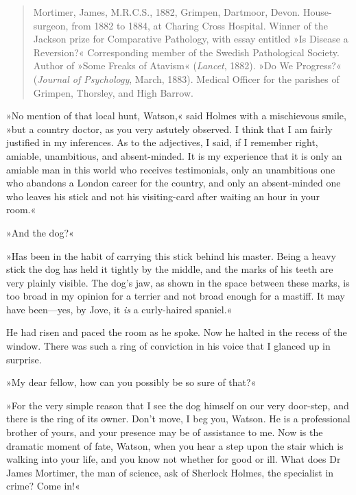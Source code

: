 \begin{quote}Mortimer, James, M.R.C.S., 1882, Grimpen, Dartmoor, Dev\-on. House-surgeon, from 1882 to 1884, at Charing Cross Hospital. Winner of the Jackson prize for Comparative Pathology, with essay entitled »Is Disease a Reversion?« Corresponding member of the Swedish Pathological Society. Author of »Some Freaks of Atavism« (\textit{Lancet}, 1882). »Do We Progress?« (\textit{Journal of Psychology}, March, 1883). Medical Officer for the parishes of Grimpen, Thorsley, and High Barrow.\end{quote}

»No mention of that local hunt, Watson,« said Holmes with a mischievous smile, »but a country doctor, as you very astutely observed. I think that I am fairly justified in my inferences. As to the adjectives, I said, if I remember right, amiable, unambitious, and absent-minded. It is my experience that it is only an amiable man in this world who receives testimonials, only an unambitious one who abandons a London career for the country, and only an absent-minded one who leaves his stick and not his visiting-card after waiting an hour in your room.«

»And the dog?«

»Has been in the habit of carrying this stick behind his master. Being a heavy stick the dog has held it tightly by the middle, and the marks of his teeth are very plainly visible. The dog's jaw, as shown in the space between these marks, is too broad in my opinion for a terrier and not broad enough for a mastiff. It may have been\allowbreak---\allowbreak yes, by Jove, it \emph{is} a curly-haired spaniel.«

He had risen and paced the room as he spoke. Now he halted in the recess of the window. There was such a ring of conviction in his voice that I glanced up in surprise.

»My dear fellow, how can you possibly be so sure of that?«

»For the very simple reason that I see the dog himself on our very door-step, and there is the ring of its owner. Don't move, I beg you, Watson. He is a professional brother of yours, and your presence may be of assistance to me. Now is the dramatic moment of fate, Watson, when you hear a step upon the stair which is walking into your life, and you know not whether for good or ill. What does Dr James Mortimer, the man of science, ask of Sherlock Holmes, the specialist in crime? Come in!«

